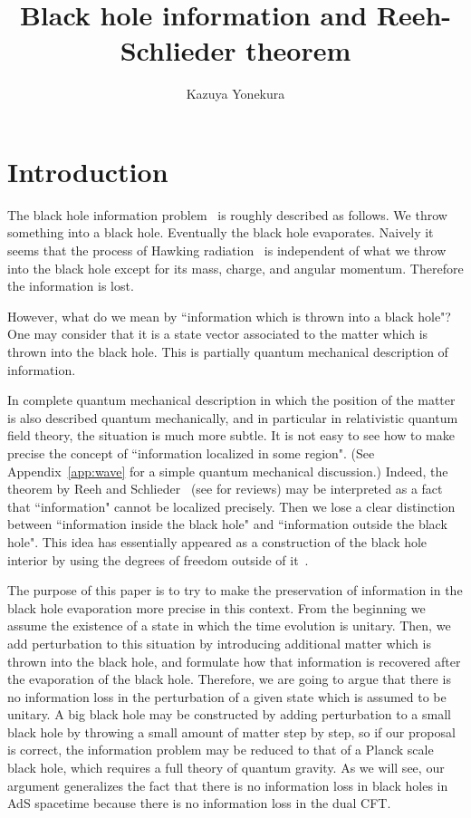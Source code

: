 \documentclass[a4paper,11pt]{article}
\title{ Black hole information and
Reeh-Schlieder theorem
}
\author{Kazuya Yonekura}
\affiliation{Faculty of Arts and Science, Kyushu University, 
 Fukuoka, Fukuoka, 819-0395, Japan
}
\theoremstyle{plain}
\theoremstyle{definition}
\numberwithin{thm}{section}
\begin{document}
\maketitle
\section{Introduction}
The black hole information problem~\cite{Hawking:1976ra} is roughly described as follows.
We throw something into a black hole. Eventually the black hole evaporates. Naively it seems that
the process of Hawking radiation~\cite{Hawking:1974sw} is independent of what we throw into the black hole except for
its mass, charge, and angular momentum. Therefore the information is lost. 

However, what do we mean by ``information which is thrown into a black hole"? One may consider that it is a state vector associated to the matter which is thrown into the black hole.
This is partially quantum mechanical description of information.

In complete quantum mechanical description in which the position of the matter is also described quantum mechanically, and in particular in
relativistic quantum field theory, the situation is much more subtle.
It is not easy to see how to make precise the concept of ``information localized in some region". 
(See Appendix~\ref{app:wave} for a simple quantum mechanical discussion.)
Indeed, the theorem by Reeh and Schlieder~\cite{RS} (see \cite{Streater:1989vi,Witten:2018zxz} for reviews) may be interpreted as a fact that ``information" cannot be
localized precisely. Then we lose a clear distinction between ``information inside the black hole" and ``information outside the black hole".
This idea has essentially appeared as a construction of the black hole interior 
by using the degrees of freedom outside of it~\cite{Papadodimas:2013wnh,Papadodimas:2013jku,Verlinde:2013qya}.

The purpose of this paper is to try to make the  preservation of information in the black hole evaporation more precise in this context.
From the beginning we assume the existence of a state in which the time evolution is unitary.
Then, we add perturbation to this situation by introducing additional matter which is thrown into the black hole, and formulate how that information is recovered 
after the evaporation of the black hole. Therefore, we are going to argue that there is no information loss in the perturbation of a given state which is assumed to be unitary.
A big black hole may be constructed by adding perturbation to a small black hole by throwing a small amount of matter step by step, 
so if our proposal is correct, the information problem may be reduced to that of a Planck scale black hole, which requires a full theory of quantum gravity.
As we will see, our argument generalizes the fact that there is no information loss in black holes in AdS spacetime because there is no information loss in the dual CFT.
\end{document}
